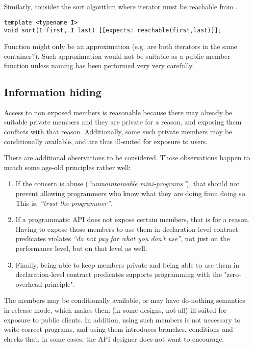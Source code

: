 Similarly, consider the sort algorithm where  iterator must be
reachable from .

\begin{lstlisting}
template <typename I>
void sort(I first, I last) [[expects: reachable(first,last)]];
\end{lstlisting}

Function  might only be an approximation (e.g. are both
iterators in the same container?). Such approximation would not be suitable as a
public member function unless naming has been performed very very carefully.

\subsection{Information hiding}

Access to non exposed members is reasonable because there may already be
suitable private members and they are private for a reason, and exposing them
conflicts with that reason.  Additionally, some such private members may be
conditionally available, and are thus ill-suited for exposure to users.

There are additional observations to be considered. Those observations happen
to match some age-old principles rather well:

\begin{enumerate}

\item If the concern is abuse (\emph{``unmaintainable mini-programs''}), that
should not prevent allowing programmers who know what they are doing from doing
so. This is, \emph{``trust the programmer''}.

\item If a programmatic API does not expose certain members, that is for a
reason. Having to expose those members to use them in declaration-level
contract predicates violates \emph{``do not pay for what you don't use''}, not
just on the performance level, but on that level as well.

\item Finally, being able to keep members private and being able to use them in
declaration-level contract predicates supports programming with the
"zero-overhead principle".

\end{enumerate}

The members may be conditionally available, or may have do-nothing semantics in
release mode, which makes them (in some designs, not all) ill-suited for
exposure to public clients. In addition, using such members is not necessary to
write correct programs, and using them introduces branches, conditions and
checks that, in some cases, the API designer does not want to encourage.

